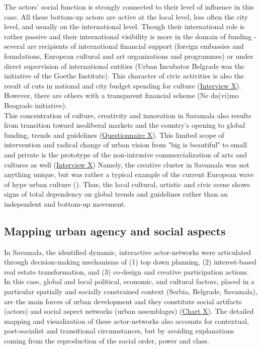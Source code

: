 \documentclass[11pt]{report}
\begin{document}
{{{{The actors’ social function is strongly connected to their level of influence in this case. All these bottom-up actors are active at the local level, less often the city level, and usually on the international level. Though their international role is rather passive and their international visibility is more in the domain of funding - several are recipients of international financial support (foreign embassies and foundations, European cultural and art organizations and programmes) or under direct supervision of international entities (Urban Incubator Belgrade was the initiative of the Goethe Institute). This character of civic activities is also the result of cuts in national and city budget spending for culture (\href{InterviewX}{Interview X}).
However, there are others with a transparent financial scheme (Ne da(vi)mo Beograde initiative). 
\\

This concentration of culture, creativity and innovation in Savamala also results from transition toward neoliberal markets and the country's opening to global funding, trends and guidelines (\href{Questionnaire Experts Savamala}{Questionnaire X}).
This limited scope of intervention and radical change of urban vision from "big is beautiful" to small and private is the prototype of the non-intrusive commercialization of arts and cultures as well (\href{InterviewX}{Interview X})
Namely, the creative cluster in Savamala was not anything unique, but was rather a typical example of the current European wave of hype urban culture (\href{B92}{\citealt{b92_savamala_2015}}).
Thus, the local cultural, artistic and civic scene shows signs of total dependency on global trends and guidelines rather than an independent and bottom-up movement. 

\subsection{Mapping urban agency and social aspects}

In Savamala, the identified dynamic, interactive actor-networks were articulated through decision-making mechanisms of (1) top down planning, (2) interest-based real estate transformation, and (3) co-design and creative participation actions. In this case, global and local political, economic, and cultural factors, placed in a particular spatially and socially constrained context (Serbia, Belgrade, Savamala), are the main forces of urban development and they constitute social artifacts (actors) and social aspect networks (urban assemblages) (\href{Table 3}{Chart X}).
The detailed mapping and visualization of these actor-networks also accounts for contextual, post-socialist and transitional circumstances, but by avoiding explanations coming from the reproduction of the social order, power and class.
\\

}}}}
\end{document}
